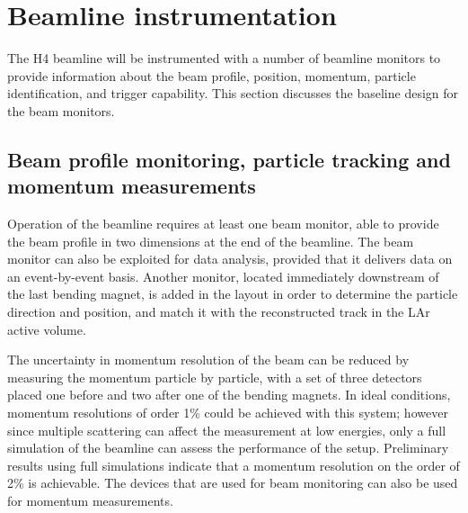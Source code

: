 \section{Beamline instrumentation}
\label{sec:beaminstruments}

The H4 beamline will be instrumented with a number of beamline monitors to provide information 
 about the beam profile, position, momentum, particle identification, and trigger capability. 
This section discusses the baseline design for the beam monitors. 

\subsection{Beam profile monitoring, particle tracking and momentum measurements}

Operation of the beamline requires at least one beam  monitor, able to provide the beam profile in two dimensions at the end of the beamline.   The beam monitor can also be exploited for data analysis, provided that it delivers data on an event-by-event basis. Another monitor, located immediately downstream of the last bending magnet, is added in the layout  in order to determine the particle  direction and position, and match it with the reconstructed track in the LAr active volume.

The uncertainty in momentum resolution of the beam can be reduced by measuring the momentum particle by particle, with a set of three detectors placed one before and two after one of the bending magnets. In ideal conditions, momentum resolutions of order 1\% could be achieved with this system; however since multiple scattering can affect the measurement
at low energies, only a full simulation of the beamline can assess the performance of the setup.  
Preliminary results using full simulations indicate that a momentum resolution on the order of  2\% is achievable. The %
devices that are used for beam monitoring can also be used for momentum measurements.
%

